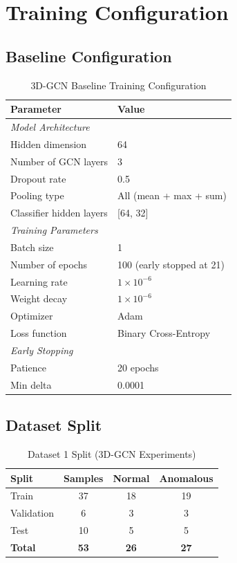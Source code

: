 \section{Training Configuration}

\subsection{Baseline Configuration}

\begin{table}[H]
\centering
\caption{3D-GCN Baseline Training Configuration}
\label{tab:gcn3d_baseline_config}
\begin{tabular}{ll}
\toprule
\textbf{Parameter} & \textbf{Value} \\
\midrule
\multicolumn{2}{l}{\textit{Model Architecture}} \\
Hidden dimension & 64 \\
Number of GCN layers & 3 \\
Dropout rate & 0.5 \\
Pooling type & All (mean + max + sum) \\
Classifier hidden layers & [64, 32] \\
\midrule
\multicolumn{2}{l}{\textit{Training Parameters}} \\
Batch size & 1 \\
Number of epochs & 100 (early stopped at 21) \\
Learning rate & $1 \times 10^{-6}$ \\
Weight decay & $1 \times 10^{-6}$ \\
Optimizer & Adam \\
Loss function & Binary Cross-Entropy \\
\midrule
\multicolumn{2}{l}{\textit{Early Stopping}} \\
Patience & 20 epochs \\
Min delta & 0.0001 \\
\bottomrule
\end{tabular}
\end{table}

\subsection{Dataset Split}

\begin{table}[H]
\centering
\caption{Dataset 1 Split (3D-GCN Experiments)}
\label{tab:dataset1_split}
\begin{tabular}{lccc}
\toprule
\textbf{Split} & \textbf{Samples} & \textbf{Normal} & \textbf{Anomalous} \\
\midrule
Train & 37 & 18 & 19 \\
Validation & 6 & 3 & 3 \\
Test & 10 & 5 & 5 \\
\midrule
\textbf{Total} & \textbf{53} & \textbf{26} & \textbf{27} \\
\bottomrule
\end{tabular}
\end{table}

